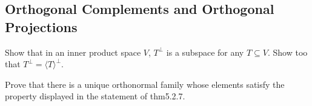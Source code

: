 \subsection{Orthogonal Complements and Orthogonal Projections}
\item Show that in an inner product space $V$, $T^\bot$ is a subspace for any $T \subseteq V$. Show too that $T^\bot = \langle T \rangle^\bot$.
  
\item Prove that there is a unique orthonormal family whose elements satisfy the property displayed in the statement of thm5.2.7.